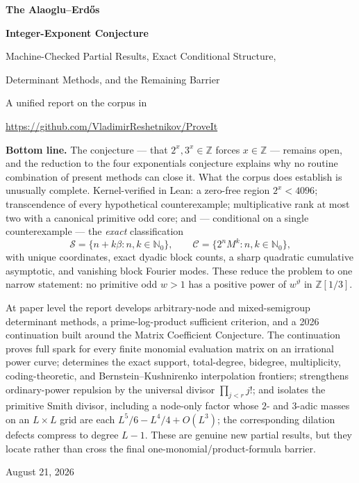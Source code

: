 \documentclass[11pt,oneside]{article}
\theoremstyle{definition}
\theoremstyle{remark}
\newcommand{\Nzero}{\mathbb N_0}
\newcommand{\Z}{\mathbb Z}
\newcommand{\thetaq}{\vartheta}
\newcommand{\Sol}{\mathcal S}
\newcommand{\Cand}{\mathcal C}
\newcommand{\Zthree}{\Z[1/3]}
\begin{document}

\begin{titlepage}
\centering
\vspace*{0.75cm}
{\Huge\bfseries The Alaoglu--Erd\H{o}s\par}
\vspace{0.2cm}
{\Huge\bfseries Integer-Exponent Conjecture\par}
\vspace{0.65cm}
{\LARGE Machine-Checked Partial Results, Exact Conditional Structure,\par}
\vspace{0.12cm}
{\LARGE Determinant Methods, and the Remaining Barrier\par}
\vspace{1.0cm}
{\large A unified report on the corpus in\par}
\vspace{0.12cm}
{\large \url{https://github.com/VladimirReshetnikov/ProveIt}\par}
\vfill
\begin{minipage}{0.9\textwidth}
\small
\textbf{Bottom line.}
The conjecture --- that $2^x,3^x\in\Z$ forces $x\in\Z$ --- remains open, and the reduction to
the four exponentials conjecture explains why no routine combination of present methods can
close it.  What the corpus does establish is unusually complete.  Kernel-verified in Lean: a
zero-free region $2^x<4096$; transcendence of every hypothetical counterexample; multiplicative
rank at most two with a canonical primitive odd core; and --- conditional on a single
counterexample --- the \emph{exact} classification
\[
  \Sol=\{n+k\beta:n,k\in\Nzero\},
  \qquad
  \Cand=\{2^nM^k:n,k\in\Nzero\},
\]
with unique coordinates, exact dyadic block counts, a sharp quadratic cumulative asymptotic,
and vanishing block Fourier modes.  These reduce the problem to one narrow statement: no
primitive odd $w>1$ has a positive power of $w^{\thetaq}$ in $\Zthree$.

At paper level the report develops arbitrary-node and mixed-semigroup determinant methods,
a prime-log-product sufficient criterion, and a 2026 continuation built around the Matrix
Coefficient Conjecture.  The continuation proves full spark for every finite monomial
evaluation matrix on an irrational power curve; determines the exact support, total-degree,
bidegree, multiplicity, coding-theoretic, and Bernstein--Kushnirenko interpolation frontiers;
strengthens ordinary-power repulsion by the universal divisor
$\prod_{j<r}j!$; and isolates the primitive Smith divisor, including a node-only factor whose
$2$- and $3$-adic masses on an $L\times L$ grid are each
$L^5/6-L^4/4+O(L^3)$; the corresponding dilation defects compress to degree $L-1$.
These are genuine
new partial results, but they locate rather than cross the final one-monomial/product-formula
barrier.
\end{minipage}
\vfill
{\large August 21, 2026\par}
\end{titlepage}
\end{document}
